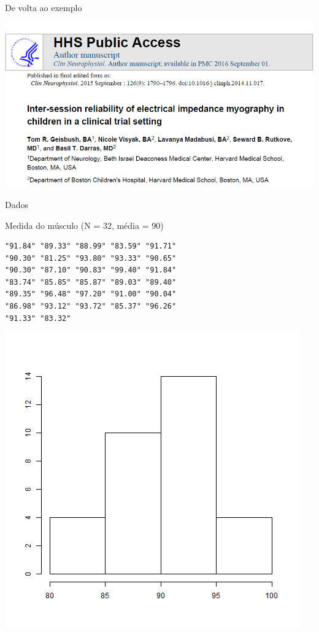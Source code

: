 \documentclass{beamer}
\begin{document}
\begin{frame}{\scriptsize De volta ao exemplo}
  \begin{center}
    \includegraphics[width=1.2\textwidth]{Cap3/DP1}
  \end{center}
\end{frame}

\begin{frame}[fragile]{\scriptsize Dados}
  \begin{exampleblock}{\scriptsize Medida do músculo (N = 32, média = 90)}
    \begin{center}
    \tiny
\begin{verbatim}
"91.84" "89.33" "88.99" "83.59" "91.71"
"90.30" "81.25" "93.80" "93.33" "90.65"
"90.30" "87.10" "90.83" "99.40" "91.84"
"83.74" "85.85" "85.87" "89.03" "89.40"
"89.35" "96.48" "97.20" "91.00" "90.04"
"86.98" "93.12" "93.72" "85.37" "96.26"
"91.33" "83.32"
\end{verbatim}
    \bigskip
    \includegraphics[height=.5\textheight]{Cap3/histograma-musculo}
  \end{center}
\end{exampleblock}
\end{frame}
\end{document}
